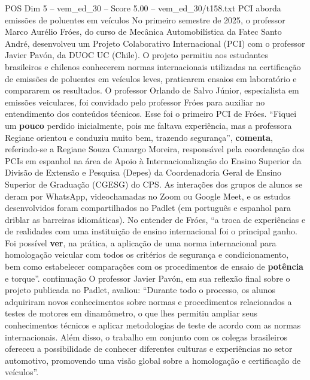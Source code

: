 \begin{textsample}{POS Dim 5 – vem\_ed\_30 – Score 5.00 – vem\_ed\_30/t158.txt}  \label{ex:f5_pos_032}
PCI aborda emissões de poluentes em veículos No primeiro semestre de 2025, o professor Marco Aurélio Fróes, do curso de Mecânica Automobilística da Fatec Santo André, desenvolveu um Projeto Colaborativo Internacional (PCI) com o professor Javier Pavón, da DUOC UC (Chile).
O projeto permitiu aos estudantes brasileiros e chilenos conhecerem normas internacionais utilizadas na certificação de emissões de poluentes em veículos leves, praticarem ensaios em laboratório e compararem os resultados.
O professor Orlando de Salvo Júnior, especialista em emissões veiculares, foi convidado pelo professor Fróes para auxiliar no entendimento dos conteúdos técnicos.
Esse foi o primeiro PCI de Fróes. “Fiquei um \textbf{pouco} perdido inicialmente, pois me faltava experiência, mas a professora Regiane orientou e conduziu muito bem, trazendo segurança”, \textbf{comenta}, referindo-se a Regiane Souza Camargo Moreira, responsável pela coordenação dos PCIs em espanhol na área de Apoio à Internacionalização do Ensino Superior da Divisão de Extensão e Pesquisa (Depes) da Coordenadoria Geral de Ensino Superior de Graduação (CGESG) do CPS.
As interações dos grupos de alunos se deram por WhatsApp, videochamadas no Zoom ou Google Meet, e os estudos desenvolvidos foram compartilhados no Padlet (em português e espanhol para driblar as barreiras idiomáticas).
No entender de Fróes, “a troca de experiências e de realidades com uma instituição de ensino internacional foi o principal ganho.
Foi possível \textbf{ver}, na prática, a aplicação de uma norma internacional para homologação veicular com todos os critérios de segurança e condicionamento, bem como estabelecer comparações com os procedimentos de ensaio de \textbf{potência} e torque”. continuação O professor Javier Pavón, em sua reflexão final sobre o projeto publicada no Padlet, avaliou: “Durante todo o processo, os alunos adquiriram novos conhecimentos sobre normas e procedimentos relacionados a testes de motores em dinamômetro, o que lhes permitiu ampliar seus conhecimentos técnicos e aplicar metodologias de teste de acordo com as normas internacionais.
Além disso, o trabalho em conjunto com os colegas brasileiros ofereceu a possibilidade de conhecer diferentes culturas e experiências no setor automotivo, promovendo uma visão global sobre a homologação e certificação de veículos”.

\end{textsample}
